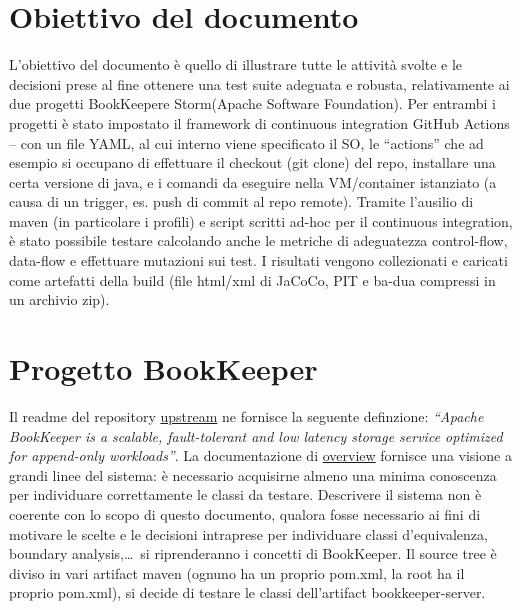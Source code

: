 \documentclass[10pt, a4paper]{article}
\title{\reporttitle}
\author{\authorsname\;(\univcode)}
\date{}
\def\bookkeeper{BookKeeper}
\def\storm{Storm}
\def\asf{Apache Software Foundation}
\begin{document}
	\maketitle
	\thispagestyle{empty}

	\tableofcontents

	\section*{Obiettivo del documento}
	L’obiettivo del documento è quello di illustrare tutte le attività svolte e le decisioni prese al fine ottenere una test suite
	adeguata e robusta, relativamente ai due progetti \bookkeeper e \storm (\asf). 
	Per entrambi i progetti è stato impostato il framework di continuous integration GitHub Actions – con un file YAML, 
	al cui interno viene specificato il SO, le “actions” che ad esempio si occupano di effettuare il checkout (git clone) del repo, 
	installare una certa versione di java, e i comandi da eseguire nella VM/container istanziato (a causa di un trigger, es. push di
	commit al repo remote). 
	Tramite l’ausilio di maven (in particolare i profili) e script scritti ad-hoc per il continuous integration, è stato possibile
	testare calcolando anche le metriche di adeguatezza control-flow, data-flow e effettuare mutazioni sui test. 
	I risultati vengono collezionati e caricati come artefatti della build
	(file html/xml di JaCoCo, PIT e ba-dua compressi in un archivio zip).

	\pagebreak

	\section{Progetto \bookkeeper}
	Il readme del repository \href{https://github.com/apache/bookkeeper}{upstream} ne fornisce 
	la seguente definzione: \textit{“Apache BookKeeper is a scalable, 
	fault-tolerant and low latency storage service optimized for append-only workloads”}. 
	La documentazione di \href{https://bookkeeper.apache.org/archives/docs/master/bookkeeperOverview.html}{overview}
	fornisce una visione a grandi linee del sistema: 
	è necessario acquisirne almeno una minima conoscenza per individuare correttamente le classi da testare. 
	Descrivere il sistema non è coerente con lo scopo di questo documento, qualora fosse necessario ai fini 
	di motivare le scelte e le decisioni intraprese per individuare classi d’equivalenza, boundary analysis,\dots\,
	si riprenderanno i concetti di \bookkeeper.
	Il source tree è diviso in vari artifact maven (ognuno ha un proprio pom.xml, la root ha il proprio pom.xml), 
	si decide di testare le classi dell'artifact bookkeeper-server. \\
	
\end{document}
